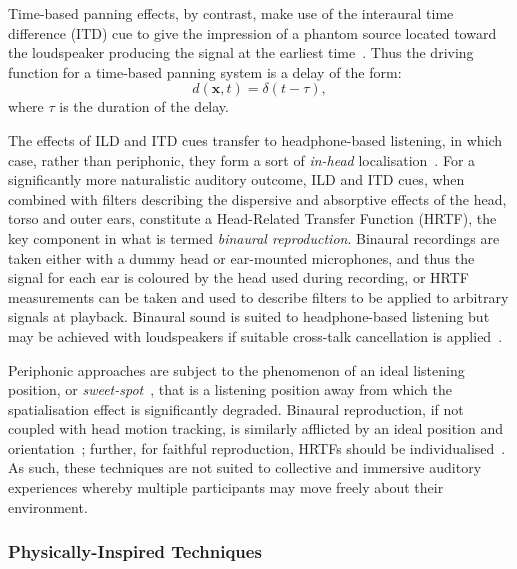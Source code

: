 \documentclass[utf8]{FrontiersinHarvard}
\begin{document}
    Time-based panning effects, by contrast, make use of the interaural time
    difference (ITD) cue to give the impression of a phantom source located toward
    the loudspeaker producing the signal at the earliest
    time~\citep{pulkki_virtual_1997,verheijen_sound_1998}.
    Thus the driving function for a time-based panning system is a delay of the
    form:
    \begin{equation}
        d(\mathbf{x},t) = \delta(t - \tau),
        \label{eq:time-driving-function}
    \end{equation}
    where $\tau$ is the duration of the delay.

    The effects of ILD and ITD cues transfer to headphone-based listening, in which
    case, rather than periphonic, they form a sort of \textit{in-head}
    localisation~\citep{ahrens_analytic_2012}.
    For a significantly more naturalistic auditory outcome, ILD and ITD cues, when
    combined with filters describing the dispersive and absorptive effects of the
    head, torso and outer ears, constitute a Head-Related Transfer Function (HRTF),
    the key component in what is termed \textit{binaural reproduction}.
    Binaural recordings are taken either with a dummy head or ear-mounted
    microphones, and thus the signal for each ear is coloured by the head used
    during recording, or HRTF measurements can be taken and used to describe filters
    to be applied to arbitrary signals at playback.
    Binaural sound is suited to headphone-based listening but may be achieved with
    loudspeakers if suitable cross-talk cancellation is
    applied~\citep{kaiser_transaural_2011}.

    Periphonic approaches are subject to the phenomenon of an ideal listening
    position, or \textit{sweet-spot}~\citep{nicol_sound_2017}, that is a listening
    position away from which the spatialisation effect is significantly degraded.
    Binaural reproduction, if not coupled with head motion tracking, is similarly
    afflicted by an ideal position and orientation~\citep{verheijen_sound_1998};
    further, for faithful reproduction, HRTFs should be
    individualised~\citep{de_poli_physically_1998}.
    As such, these techniques are not suited to collective and immersive auditory
    experiences whereby multiple participants may move freely about their
    environment.

    \subsubsection{Physically-Inspired Techniques}\label{subsubsec:sound-field-synthesis}
\end{document}
